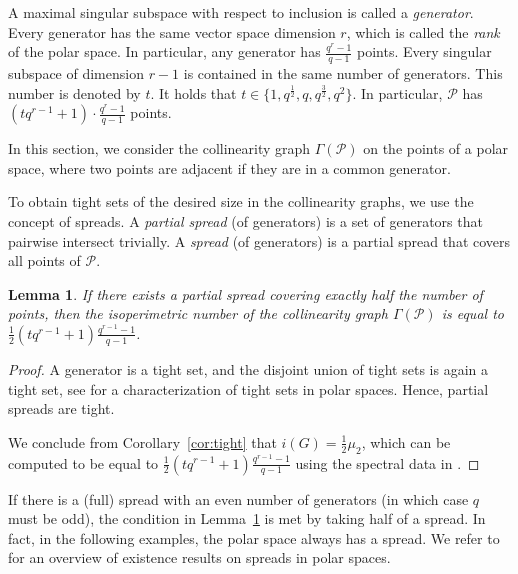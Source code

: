 \documentclass[a4paper,11pt]{article}
\newtheorem{lemma}[theorem]{Lemma}
\theoremstyle{definition}
\begin{document}
A maximal singular subspace with respect to inclusion is called a \emph{generator}. 
Every generator has the same vector space dimension $r$, which is called the \emph{rank} of the polar space. In particular, any generator has $\frac{q^r-1}{q-1}$ points. Every singular subspace of dimension \(r-1\) is contained in the same number of generators. This number is denoted by \(t\). It holds that \(t \in \{1,q^\frac12,q,q^\frac32,q^2\}\). In particular, \(\mathcal{P}\) has \((tq^{r-1}+1)\cdot\frac{q^r-1}{q-1}\) points. %

In this section, we consider the collinearity graph $\Gamma(\mathcal{P})$ on the points of a polar space, where two points are adjacent if they are in a common generator. 

To obtain tight sets of the desired size in the collinearity graphs, we use the concept of spreads.
A \emph{partial spread} (of generators) is a set of generators that pairwise intersect trivially. A \emph{spread} (of generators) is a partial spread that covers all points of $\mathcal{P}$. 

\begin{lemma}\label{lem:partialspread}
     If there exists a partial spread 
     covering exactly half the number of points, then the isoperimetric number of the collinearity graph \(\Gamma(\mathcal{P})\) is equal to \(\frac{1}{2}(tq^{r-1}+1)\frac{q^{r-1}-1}{q-1}\).
\end{lemma}
\begin{proof}
    A generator is a tight set, and the disjoint union of tight sets is again a tight set, see \cite[Theorem~8.1]{Drudge} for a characterization of tight sets in polar spaces.
    Hence, partial spreads are tight.
     
      We conclude from Corollary~\ref{cor:tight} that $i(G) = \frac12\mu_2$, which can be computed to be equal to \(\frac12(tq^{r-1}+1)\frac{q^{r-1}-1}{q-1}\) using the spectral data in \cite[Theorem 2.2.12]{StronglyBrouwer}.     
\end{proof}

If there is a (full) spread with an even number of generators (in which case $q$ must be odd), the condition in Lemma~\ref{lem:partialspread} is met by taking half of a spread.
In fact, in the following examples, the polar space always has a spread.  
We refer to \cite[Table~7.4]{HT2016} for an overview of existence results on spreads in polar spaces. 
\end{document}
